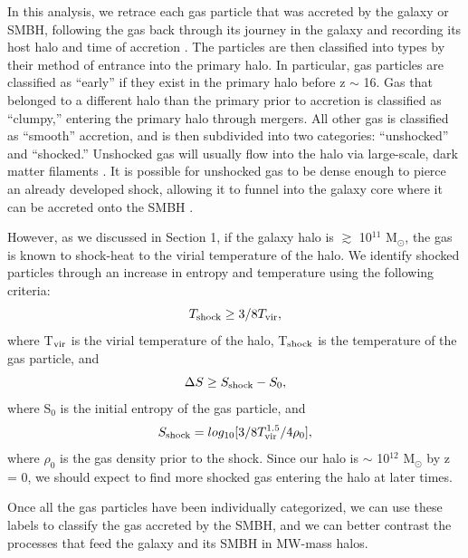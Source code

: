 \documentclass[]{emulateapj}
\begin{document}
In this analysis, we retrace each gas particle that was accreted by the galaxy or SMBH, following the gas back through its journey in the galaxy and recording its host halo and time of accretion \citep{Brooks2009}. The particles are then classified into types by their method of entrance into the primary halo. In particular, gas particles are classified as ``early'' if they exist in the primary halo before z $\sim$ 16. Gas that belonged to a different halo than the primary prior to accretion is classified as ``clumpy,'' entering the primary halo through mergers. All other gas is classified as ``smooth'' accretion, and is then subdivided into two categories: ``unshocked'' and ``shocked.'' Unshocked gas will usually flow into the halo via large-scale, dark matter filaments \citep{Keres2005,Bellovary2013}. It is possible for unshocked gas to be dense enough to pierce an already developed shock, allowing it to funnel into the galaxy core where it can be accreted onto the SMBH \citep{Nelson2013}.

However, as we discussed in Section 1, if the galaxy halo is $\gtrsim$ 10$^{11}$ M$_{\odot} $, the gas is known to shock-heat to the virial temperature of the halo. We identify shocked particles through an increase in entropy and temperature using the following criteria:
\begin{equation}
T_{\rm shock} \geq 3/8 T_{\rm vir},
\end{equation}
where T$_{\rm vir}$ is the virial temperature of the halo, T$_{\rm shock}$ is the temperature of the gas particle, and 
\begin{equation}
\Delta S \geq S_{\rm shock} - S_0,
\end{equation}
where S$_0$ is the initial entropy of the gas particle, and 
\begin{equation}
S_{\rm shock} = log_{10}[3/8 T_{\rm vir}^{1.5}/4 \rho_0],
\end{equation}
where $\rho_0$ is the gas density prior to the shock. Since our halo is $\sim$ 10$^{12}$ M$_{\odot} $ by z = 0, we should expect to find more shocked gas entering the halo at later times.

Once all the gas particles have been individually categorized, we can use these labels to classify the gas accreted by the SMBH, and we can better contrast the processes that feed the galaxy and its SMBH in MW-mass halos.

\end{document}
